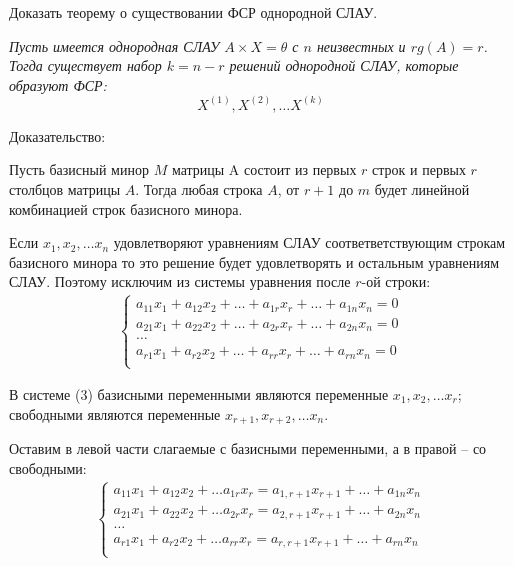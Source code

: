 \begin{question}
  Доказать теорему о существовании ФСР однородной СЛАУ.
\end{question}
\begin{answer}
  \textit{Пусть имеется однородная СЛАУ $A \times X = \theta$ с $n$ неизвестных и $rg(A) = r$. \\
  Тогда существует набор  $k = n - r$ решений однородной СЛАУ, которые образуют ФСР:  \[
    X^{(1)}, X^{(2)}, \ldots X^{(k)}
\]}

  Доказательство:

  Пусть базисный минор $M$ матрицы A состоит из первых $r$ строк и первых $r$ столбцов матрицы $A$.
  Тогда любая строка $A$, от $r+1$ до $m$ будет линейной комбинацией строк базисного минора.

  Если  $x_1, x_2, \ldots x_{n}$ удовлетворяют уравнениям СЛАУ соответветствующим строкам базисного минора то это решение будет удовлетворять и остальным уравнениям СЛАУ.
  Поэтому исключим из системы уравнения после $r$-ой строки:
  \begin{gather*}
    \begin{cases}
      a_{11} x_1 + a_{12} x_2 + \ldots + a_{1r} x_r + \ldots + a_{1n} x_{n} = 0 \\
      a_{21} x_1 + a_{22} x_2 + \ldots + a_{2r} x_r + \ldots + a_{2n} x_{n} = 0 \\
      \ldots \\
      a_{r1} x_1 + a_{r2} x_2 + \ldots + a_{rr} x_r + \ldots + a_{rn} x_{n} = 0 \\
    \end{cases} \tag{3} 
  \end{gather*}

  В системе (3) базисными переменными являются переменные $x_1, x_2, \ldots x_r$; свободными являются переменные $x_{r+1}, x_{r+2}, \ldots x_n$.

  Оставим в левой части слагаемые с базисными переменными, а в правой -- со свободными:
  \begin{gather*}
    \begin{cases}
      a_{11} x_1 + a_{12} x_2 + \ldots a_{1r} x_r = a_{1,r+1} x_{r+1} + \ldots + a_{1n} x_{n} \\ 
      a_{21} x_1 + a_{22} x_2 + \ldots a_{2r} x_r = a_{2,r+1} x_{r+1} + \ldots + a_{2n} x_{n} \\ 
      \ldots \\
      a_{r1} x_1 + a_{r2} x_2 + \ldots a_{rr} x_r = a_{r,r+1} x_{r+1} + \ldots + a_{rn} x_{n} \\ 
    \end{cases} \tag{4} 
  \end{gather*}


\end{answer}
